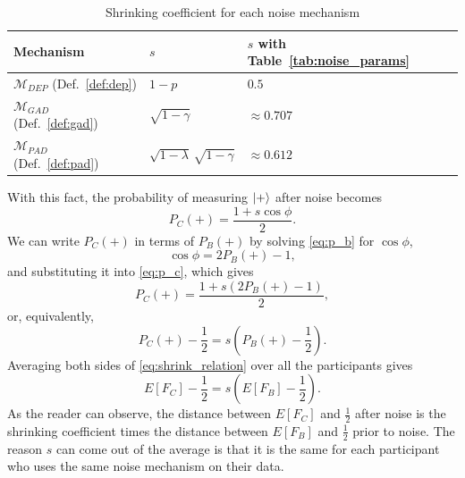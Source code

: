 \documentclass{ieeeaccess}
\begin{document}
\begin{table}[H]
  \caption{Shrinking coefficient for each noise mechanism}
  \label{tab:shrinking_coefficient}
  \centering
  \begin{tabular}{lll}
    \toprule
    Mechanism & $s$ & $s$ with Table~\ref{tab:noise_params} \\
    \midrule
    $\mathcal{M}_{DEP}$ (Def.~\ref{def:dep}) & $1 - p$ & $0.5$ \\
    $\mathcal{M}_{GAD}$ (Def.~\ref{def:gad}) & $\sqrt{1 - \gamma}$ & $\approx 0.707$ \\
    $\mathcal{M}_{PAD}$ (Def.~\ref{def:pad}) & $\sqrt{1 - \lambda}\,\sqrt{1 - \gamma}$ & $\approx 0.612$ \\
    \bottomrule
  \end{tabular}
\end{table}

With this fact, the probability of measuring $\ket{+}$ after noise becomes
\begin{equation}
  P_C(+) = \frac{1+s\cos\phi}{2}.
  \label{eq:p_c}
\end{equation}
We can write $P_C(+)$ in terms of $P_B(+)$ by solving \eqref{eq:p_b} for $\cos\phi$,
\begin{equation}
  \cos\phi = 2P_B(+) - 1,
  \label{eq:cos_phi}
\end{equation}
and substituting it into \eqref{eq:p_c}, which gives
\begin{equation}
  P_C(+) = \frac{1+s\left(2P_B(+) - 1\right)}{2},
  \label{eq:p_c_of_p_b}
\end{equation}
or, equivalently,
\begin{equation}
  P_C(+) - \frac{1}{2} = s\left(P_B(+) - \frac{1}{2}\right).
  \label{eq:shrink_relation}
\end{equation}
Averaging both sides of \eqref{eq:shrink_relation} over all the participants gives
\begin{equation}
  E[F_C] - \frac{1}{2} = s\left(E[F_B] - \frac{1}{2}\right).
  \label{eq:expected_shrink}
\end{equation}
As the reader can observe, the distance between $E[F_C]$ and $\frac{1}{2}$ after noise is the shrinking coefficient times the distance between $E[F_B]$ and $\frac{1}{2}$ prior to noise. The reason $s$ can come out of the average is that it is the same for each participant who uses the same noise mechanism on their data.
\end{document}
